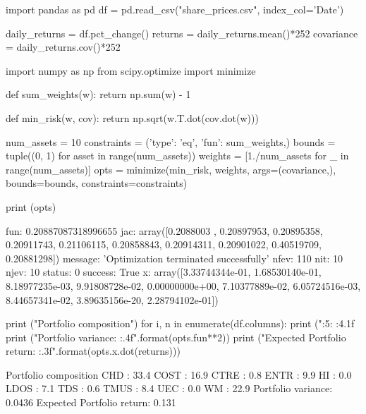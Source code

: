 \cprotEnv \begin{solution}
\begin{ipython}
import pandas as pd
df = pd.read_csv("share_prices.csv", index_col='Date')

daily_returns = df.pct_change()
returns = daily_returns.mean()*252
covariance = daily_returns.cov()*252
\end{ipython}
\begin{ipython}
import numpy as np
from scipy.optimize import minimize

def sum_weights(w):
    return np.sum(w) - 1

def min_risk(w, cov):
    return np.sqrt(w.T.dot(cov.dot(w)))

num_assets = 10
constraints = ({'type': 'eq', 'fun': sum_weights},)
bounds = tuple((0, 1) for asset in range(num_assets))
weights = [1./num_assets for _ in range(num_assets)]
opts = minimize(min_risk, weights, args=(covariance,),
                bounds=bounds, constraints=constraints)

print (opts)
\end{ipython}
\begin{ioutput}
     fun: 0.20887087318996655
     jac: array([0.2088003 , 0.20897953, 0.20895358, 0.20911743, 0.21106115,
                 0.20858843, 0.20914311, 0.20901022, 0.40519709, 0.20881298])
 message: 'Optimization terminated successfully'
    nfev: 110
     nit: 10
    njev: 10
  status: 0
 success: True
       x: array([3.33744344e-01, 1.68530140e-01, 8.18977235e-03, 9.91808728e-02,
                 0.00000000e+00, 7.10377889e-02, 6.05724516e-03, 8.44657341e-02,
                 3.89635156e-20, 2.28794102e-01])
\end{ioutput}
\begin{ipython}
print ("Portfolio composition")
for i, n in enumerate(df.columns):
    print ("{:5}: {:4.1f}%
print ("Portfolio variance: {:.4f}".format(opts.fun**2))
print ("Expected Portfolio return: {:.3f}".format(opts.x.dot(returns)))
\end{ipython}
\begin{ioutput}
Portfolio composition
CHD  : 33.4%
COST : 16.9%
CTRE :  0.8%
ENTR :  9.9%
HI   :  0.0%
LDOS :  7.1%
TDS  :  0.6%
TMUS :  8.4%
UEC  :  0.0%
WM   : 22.9%
Portfolio variance: 0.0436
Expected Portfolio return: 0.131
\end{ioutput}
\end{solution}

